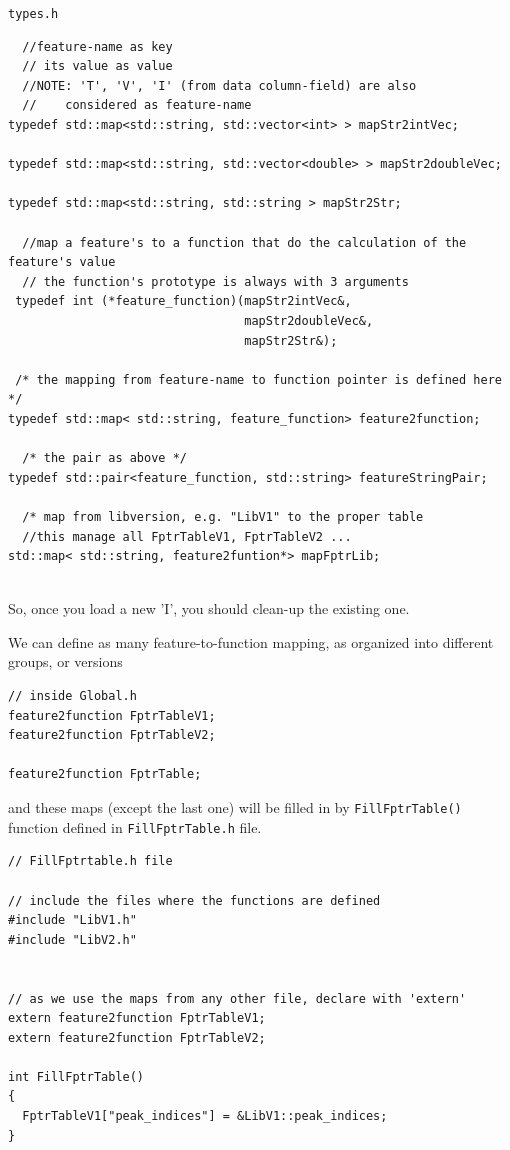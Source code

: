 \verb!types.h! 
\begin{lstlisting}
  //feature-name as key
  // its value as value
  //NOTE: 'T', 'V', 'I' (from data column-field) are also
  //    considered as feature-name
typedef std::map<std::string, std::vector<int> > mapStr2intVec;

typedef std::map<std::string, std::vector<double> > mapStr2doubleVec;

typedef std::map<std::string, std::string > mapStr2Str;

  //map a feature's to a function that do the calculation of the feature's value
  // the function's prototype is always with 3 arguments
 typedef int (*feature_function)(mapStr2intVec&, 
                                 mapStr2doubleVec&,
                                 mapStr2Str&);

 /* the mapping from feature-name to function pointer is defined here */
typedef std::map< std::string, feature_function> feature2function;

  /* the pair as above */
typedef std::pair<feature_function, std::string> featureStringPair;

  /* map from libversion, e.g. "LibV1" to the proper table
  //this manage all FptrTableV1, FptrTableV2 ...
std::map< std::string, feature2funtion*> mapFptrLib;  


\end{lstlisting}
So, once you load a new 'I', you should clean-up the existing one.

We can define as many feature-to-function mapping, as organized into different
groups, or versions
\begin{lstlisting}
// inside Global.h
feature2function FptrTableV1;
feature2function FptrTableV2;

feature2function FptrTable;
\end{lstlisting}

and these maps (except the last one) will be filled in by \verb!FillFptrTable()!
function defined in \verb!FillFptrTable.h! file.
\begin{lstlisting}
// FillFptrtable.h file

// include the files where the functions are defined
#include "LibV1.h"
#include "LibV2.h"


// as we use the maps from any other file, declare with 'extern'
extern feature2function FptrTableV1;
extern feature2function FptrTableV2;

int FillFptrTable()
{
  FptrTableV1["peak_indices"] = &LibV1::peak_indices;
}
\end{lstlisting}


